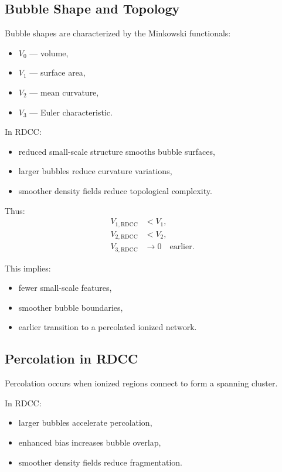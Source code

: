 \documentclass[11pt,a4paper]{article}
\begin{document}
\subsection{Bubble Shape and Topology}

Bubble shapes are characterized by the Minkowski functionals:
\begin{itemize}
\item $V_{0}$ — volume,
\item $V_{1}$ — surface area,
\item $V_{2}$ — mean curvature,
\item $V_{3}$ — Euler characteristic.
\end{itemize}

In RDCC:
\begin{itemize}
\item reduced small-scale structure smooths bubble surfaces,
\item larger bubbles reduce curvature variations,
\item smoother density fields reduce topological complexity.
\end{itemize}

Thus:
\begin{align}
V_{1,\mathrm{RDCC}} &< V_{1}, \\
V_{2,\mathrm{RDCC}} &< V_{2}, \\
V_{3,\mathrm{RDCC}} &\rightarrow 0 \quad \text{earlier}.
\end{align}

This implies:
\begin{itemize}
\item fewer small-scale features,
\item smoother bubble boundaries,
\item earlier transition to a percolated ionized network.
\end{itemize}

\subsection{Percolation in RDCC}

Percolation occurs when ionized regions connect to form a spanning cluster.

In RDCC:
\begin{itemize}
\item larger bubbles accelerate percolation,
\item enhanced bias increases bubble overlap,
\item smoother density fields reduce fragmentation.
\end{itemize}
\end{document}
